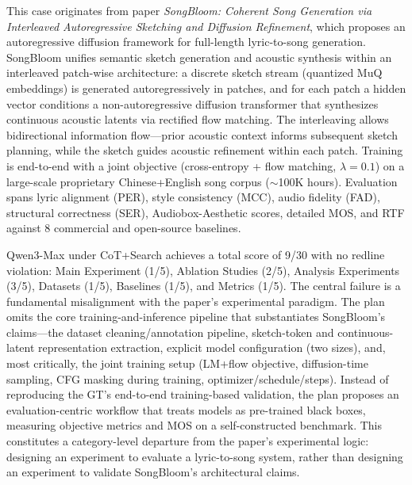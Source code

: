 This case originates from paper \textit{SongBloom: Coherent Song Generation via Interleaved Autoregressive Sketching and Diffusion Refinement}\cite{yang2026songbloom}, which proposes an autoregressive diffusion framework for full-length lyric-to-song generation. SongBloom unifies semantic sketch generation and acoustic synthesis within an interleaved patch-wise architecture: a discrete sketch stream (quantized MuQ embeddings) is generated autoregressively in patches, and for each patch a hidden vector conditions a non-autoregressive diffusion transformer that synthesizes continuous acoustic latents via rectified flow matching. The interleaving allows bidirectional information flow---prior acoustic context informs subsequent sketch planning, while the sketch guides acoustic refinement within each patch. Training is end-to-end with a joint objective (cross-entropy + flow matching, $\lambda=0.1$) on a large-scale proprietary Chinese+English song corpus ($\sim$100K hours). Evaluation spans lyric alignment (PER), style consistency (MCC), audio fidelity (FAD), structural correctness (SER), Audiobox-Aesthetic scores, detailed MOS, and RTF against 8 commercial and open-source baselines.

Qwen3-Max under CoT+Search achieves a total score of 9/30 with no redline violation: Main Experiment (1/5), Ablation Studies (2/5), Analysis Experiments (3/5), Datasets (1/5), Baselines (1/5), and Metrics (1/5). The central failure is a fundamental misalignment with the paper's experimental paradigm. The plan omits the core training-and-inference pipeline that substantiates SongBloom's claims---the dataset cleaning/annotation pipeline, sketch-token and continuous-latent representation extraction, explicit model configuration (two sizes), and, most critically, the joint training setup (LM+flow objective, diffusion-time sampling, CFG masking during training, optimizer/schedule/steps). Instead of reproducing the GT's end-to-end training-based validation, the plan proposes an evaluation-centric workflow that treats models as pre-trained black boxes, measuring objective metrics and MOS on a self-constructed benchmark. This constitutes a category-level departure from the paper's experimental logic: designing an experiment to evaluate a lyric-to-song system, rather than designing an experiment to validate SongBloom's architectural claims.

